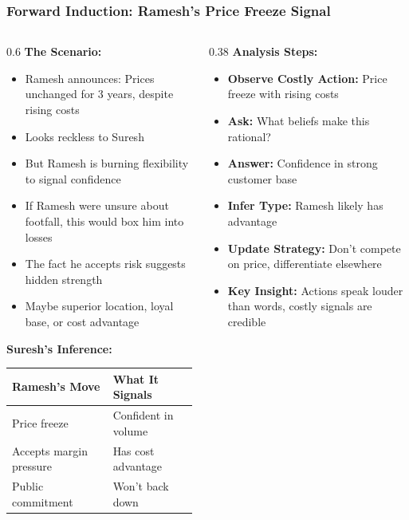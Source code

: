 \begin{frame}[fragile]\frametitle{Forward Induction: Ramesh's Price Freeze Signal}
\begin{columns}
    \begin{column}[T]{0.6\linewidth}
      \textbf{The Scenario:}
      \begin{itemize}
        \item Ramesh announces: Prices unchanged for 3 years, despite rising costs
        \item Looks reckless to Suresh
        \item But Ramesh is burning flexibility to signal confidence
        \item If Ramesh were unsure about footfall, this would box him into losses
        \item The fact he accepts risk suggests hidden strength
        \item Maybe superior location, loyal base, or cost advantage
      \end{itemize}
      
      \vspace{6pt}
      \textbf{Suresh's Inference:}
      \begin{center}
      \small
      \begin{tabular}{|l|l|}
        \hline
        \textbf{Ramesh's Move} & \textbf{What It Signals} \\
        \hline
        Price freeze & Confident in volume \\
        Accepts margin pressure & Has cost advantage \\
        Public commitment & Won't back down \\
        \hline
      \end{tabular}
      \end{center}
    \end{column}
    \begin{column}[T]{0.38\linewidth}
      \textbf{Analysis Steps:}
      \begin{itemize}
        \item \textbf{Observe Costly Action:} Price freeze with rising costs
        \item \textbf{Ask:} What beliefs make this rational?
        \item \textbf{Answer:} Confidence in strong customer base
        \item \textbf{Infer Type:} Ramesh likely has advantage
        \item \textbf{Update Strategy:} Don't compete on price, differentiate elsewhere
        \item \textbf{Key Insight:} Actions speak louder than words, costly signals are credible
      \end{itemize}
    \end{column}
  \end{columns}
\end{frame}


